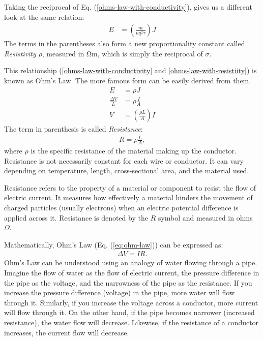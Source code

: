 \documentclass[12pt,b4paper]{article}
\begin{document}
Taking the reciprocal of Eq. (\ref{ohms-law-with-conductivity}), gives us a different look at the same relation:
\begin{align}
    E&=\left(\frac{m}{nq^2\tau}\right)J\label{ohms-law-with-resistiity}
\end{align}
The terms in the parentheses also form a new proportionality constant called \textit{Resistivity} $\rho$, measured in $\unit{\ohm\meter}$, which is simply the reciprocal of $\sigma$.

This relationship (\ref{ohms-law-with-conductivity} and \ref{ohms-law-with-resistiity}) is known as Ohm's Law. The more famous form can be easily derived from them.
\begin{align}
    {E}&=\rho{J}\\
    \frac{\Delta V}{L}&=\rho\frac{I}{A}\\
    V&=\left(\frac{\rho L}{A}\right)I\label{eq:ohm-law}
\end{align}
The term in parenthesis is called \textit{Resistance}:
\begin{align}
    R=\rho\frac{L}{A},
\end{align}
where $\rho$ is the specific resistance of the material making up the conductor. Resistance is not necessarily constant for each wire or conductor. It can vary depending on temperature, length, cross-sectional area, and the material used.

Resistance refers to the property of a material or component to resist the flow of electric current. It measures how effectively a material hinders the movement of charged particles (usually electrons) when an electric potential difference is applied across it. Resistance is denoted by the $R$ symbol and measured in ohms $\Omega$.

Mathematically, Ohm's Law (Eq. (\ref{eq:ohm-law})) can be expressed as:
\begin{align}
    \Delta V=IR.
\end{align}
Ohm's Law can be understood using an analogy of water flowing through a pipe. Imagine the flow of water as the flow of electric current, the pressure difference in the pipe as the voltage, and the narrowness of the pipe as the resistance. If you increase the pressure difference (voltage) in the pipe, more water will flow through it. Similarly, if you increase the voltage across a conductor, more current will flow through it. On the other hand, if the pipe becomes narrower (increased resistance), the water flow will decrease. Likewise, if the resistance of a conductor increases, the current flow will decrease.
\end{document}

